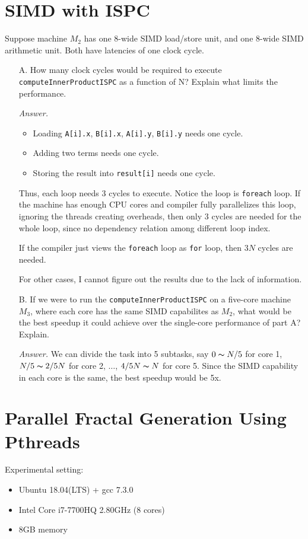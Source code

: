\documentclass[english]{thesis}
\begin{document}
\section{SIMD with ISPC}
Suppose machine $M_2$ has one 8-wide SIMD load/store unit, and one 8-wide SIMD arithmetic unit.
Both have latencies of one clock cycle.
\begin{itemize}
\item[A.] How many clock cycles would be required to execute \verb'computeInnerProductISPC' as a function of N?
Explain what limits the performance.

\bigskip
\textit{Answer.}
\begin{itemize}
\item Loading \verb'A[i].x', \verb'B[i].x', \verb'A[i].y', \verb'B[i].y' needs one cycle.
\item Adding two terms needs one cycle.
\item Storing the result into \verb'result[i]' needs one cycle.
\end{itemize}
Thus, each loop needs $3$ cycles to execute.
Notice the loop is \verb'foreach' loop.
If the machine has enough CPU cores and compiler fully parallelizes this loop, ignoring the threads creating overheads, then only $3$ cycles are needed for the whole loop, since no dependency relation among different loop index.

If the compiler just views the \verb'foreach' loop as \verb'for' loop, then $3N$ cycles are needed.

For other cases, I cannot figure out the results due to the lack of information.

\bigskip
\item[B.] If we were to run the \verb'computeInnerProductISPC' on a five-core machine $M_3$, where each core has the same SIMD capabilites as $M_2$, what would be the best speedup it could achieve over the single-core performance of part A?
Explain.

\bigskip
\textit{Answer.}
We can divide the task into 5 subtasks, say $0\thicksim N/5$ for core 1, $N/5\thicksim 2/5N$ for core 2, $\ldots$, $4/5N\thicksim N$ for core 5.
Since the SIMD capability in each core is the same, the best speedup would be 5x.

\bigskip
\end{itemize}

\section{Parallel Fractal Generation Using Pthreads}
Experimental setting:
\begin{itemize}
	\item Ubuntu 18.04(LTS) + gcc 7.3.0
	\item Intel Core i7-7700HQ 2.80GHz (8 cores)
	\item 8GB memory
\end{itemize}
\end{document}
